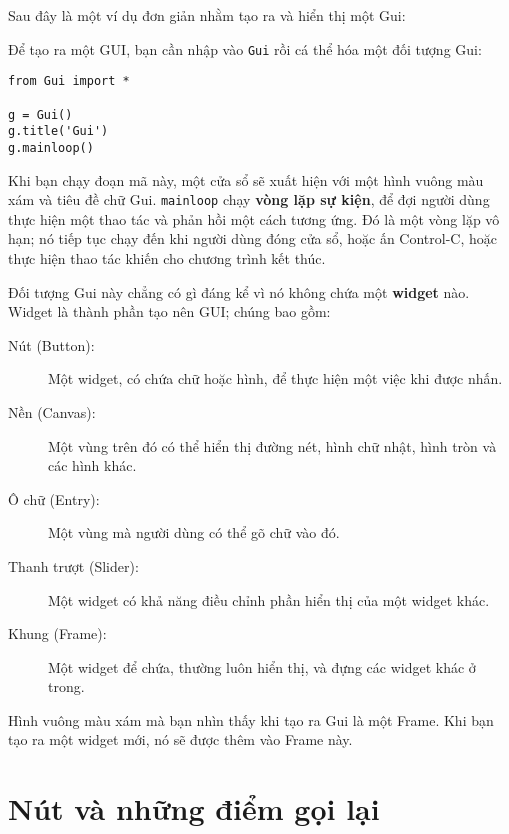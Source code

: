 \documentclass[11pt]{book}
\begin{document}
Sau đây là một ví dụ đơn giản nhằm tạo ra và hiển thị một Gui:

Để tạo ra một GUI, bạn cần nhập vào {\tt Gui} rồi cá thể hóa
một đối tượng Gui:

\beforeverb
\begin{verbatim}
from Gui import *

g = Gui()
g.title('Gui')
g.mainloop()
\end{verbatim}
\afterverb
%
Khi bạn chạy đoạn mã này, một cửa sổ sẽ xuất hiện với một hình vuông 
màu xám và tiêu đề chữ {\sf Gui}.  {\tt mainloop} chạy {\bf vòng lặp
  sự kiện}, để đợi người dùng thực hiện một thao tác và phản hồi một cách
tương ứng. Đó là một vòng lặp vô hạn; nó tiếp tục chạy đến khi người dùng đóng
cửa sổ, hoặc ấn Control-C, hoặc thực hiện thao tác khiến cho chương trình
kết thúc.


Đối tượng Gui này chẳng có gì đáng kể vì nó không chứa một
{\bf widget} nào.  Widget là thành phần tạo nên 
GUI; chúng bao gồm:


\begin{description}

\item[Nút (Button):] Một widget, có chứa chữ hoặc hình, để thực hiện một việc
khi được nhấn.

\item[Nền (Canvas):] Một vùng trên đó có thể hiển thị đường nét, hình chữ nhật,
hình tròn và các hình khác.

\item[Ô chữ (Entry):] Một vùng mà người dùng có thể gõ chữ vào đó.

\item[Thanh trượt (Slider):] Một widget có khả năng điều chỉnh phần hiển thị
của một widget khác.

\item[Khung (Frame):] Một widget để chứa, thường luôn hiển thị, và đựng các
widget khác ở trong.

\end{description}

Hình vuông màu xám mà bạn nhìn thấy khi tạo ra Gui là
một Frame.  Khi bạn tạo ra một widget mới, nó sẽ được thêm vào Frame này.



\section{Nút và những điểm gọi lại}
\end{document}
